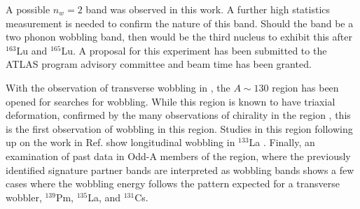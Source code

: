 A possible $n_w=2$ band was observed in this work. A further high statistics measurement is needed to confirm the nature of this band. Should the band be a two phonon wobbling band, then \pr{} would be the third nucleus to exhibit this after $^{163}$Lu and $^{165}$Lu. A proposal for this experiment has been submitted to the ATLAS program advisory committee and beam time has been granted.

With the observation of transverse wobbling in \pr{}, the $A\sim{}130$ region has been opened for searches for wobbling. While this region is known to have triaxial deformation, confirmed by the many observations of chirality in the region \cite{chiralityIn134Pr,chiralityA130Region,chiralityUpperA130Region,chiralityA130Region2,chirality136Pm,chiralityMore135Nd,chiralityIn135Nd,chiralityMulti133Cs}, this is the first observation of wobbling in this region. Studies in this region following up on the work in Ref. \cite{mattaTransversePRL} show longitudinal wobbling in $^{133}$La \cite{palitLongWobbling}. Finally, an examination of past data in Odd-A members of the region, where the previously identified signature partner bands are interpreted as wobbling bands shows a few cases where the wobbling energy follows the pattern expected for a transverse wobbler, $^{139}$Pm, $^{135}$La, and $^{131}$Cs.

